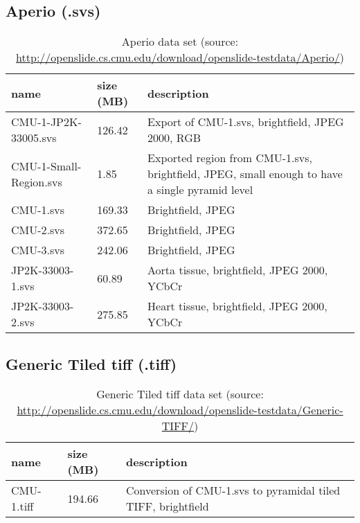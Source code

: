 \subsection{Aperio (.svs)}
\label{sec_A1}

\begin{table}[H]
	\begin{center}
		\begin{tabular}{| p{4cm} | p{2cm} | p{5cm} |}
			\hline
			\textbf{name} & \textbf{size (MB)} & \textbf{description} \\ \hline
			CMU-1-JP2K-33005.svs & 126.42 & Export of CMU-1.svs, brightfield, JPEG 2000, RGB\\ \hline
			CMU-1-Small-Region.svs & 1.85 & Exported region from CMU-1.svs, brightfield, JPEG, small enough to have a single pyramid level \\ \hline
			CMU-1.svs & 169.33 & Brightfield, JPEG \\ \hline
			CMU-2.svs & 372.65 & Brightfield, JPEG \\ \hline	
			CMU-3.svs & 242.06 & Brightfield, JPEG \\ \hline	
			JP2K-33003-1.svs & 60.89 & Aorta tissue, brightfield, JPEG 2000, YCbCr \\ \hline
			JP2K-33003-2.svs & 275.85 & Heart tissue, brightfield, JPEG 2000, YCbCr  \\ \hline
		\end{tabular}
		\caption{Aperio data set (source: \url{http://openslide.cs.cmu.edu/download/openslide-testdata/Aperio/})}
	\end{center}
\end{table}


\subsection{Generic Tiled tiff (.tiff)}

\begin{table}[H]
	\begin{center}
		\begin{tabular}{| p{4cm} | p{2cm} | p{5cm} |}
			\hline
			\textbf{name} & \textbf{size (MB)} & \textbf{description} \\ \hline
			CMU-1.tiff & 194.66 & Conversion of CMU-1.svs to pyramidal tiled TIFF, brightfield \\ \hline
		\end{tabular}
		\caption{Generic Tiled tiff data set (source: \url{http://openslide.cs.cmu.edu/download/openslide-testdata/Generic-TIFF/})}
	\end{center}
\end{table}


